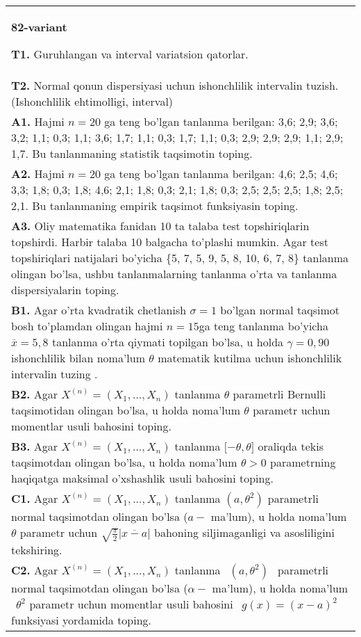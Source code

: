 \documentclass{article}
\begin{document}
\begin{tabular}{m{17cm}}
\textbf{82-variant}
\newline

\textbf{T1.} 
Guruhlangan va interval variatsion qatorlar.
\\
\textbf{T2.} 
Normal qonun dispersiyasi uchun ishonchlilik intervalin tuzish. (Ishonchlilik ehtimolligi, interval)
\\
\textbf{A1.} 
Hajmi \(n = 20\) ga teng bo'lgan tanlanma berilgan: 3,6; 2,9; 3,6; 3,2; 1,1; 0,3; 1,1; 3,6; 1,7; 1,1; 0,3; 1,7; 1,1; 0,3; 2,9; 2,9; 2,9; 1,1; 2,9; 1,7. Bu tanlanmaning statistik taqsimotin toping.
\\
\textbf{A2.} 
Hajmi \(n = 20\) ga teng bo'lgan tanlanma berilgan: 4,6; 2,5; 4,6; 3,3; 1,8; 0,3; 1,8; 4,6; 2,1; 1,8; 0,3; 2,1; 1,8; 0,3; 2,5; 2,5; 2,5; 1,8; 2,5; 2,1. Bu tanlanmaning empirik taqsimot funksiyasin toping.
\\
\textbf{A3.} 
Oliy matematika fanidan 10 ta talaba test topshiriqlarin topshirdi. Harbir talaba 10 balgacha to'plashi mumkin. Agar test topshiriqlari natijalari bo'yicha \{5, 7, 5, 9, 5, 8, 10, 6, 7, 8\} tanlanma olingan bo'lsa, ushbu tanlanmalarning tanlanma o'rta va tanlanma dispersiyalarin toping.
\\
\textbf{B1.} 
Agar o'rta kvadratik chetlanish \(\sigma = 1\) bo'lgan normal taqsimot bosh to'plamdan olingan hajmi \(n = 15\)ga teng tanlanma bo'yicha \(\overline{x} = 5,8\) tanlanma o'rta qiymati topilgan bo'lsa, u holda \(\gamma = 0,90\) ishonchlilik bilan noma'lum \(\theta\) matematik kutilma uchun ishonchlilik intervalin tuzing .
\\
\textbf{B2.} 
Agar \(X^{(n)} = \left( X_{1},...,X_{n} \right)\) tanlanma \(\theta\) parametrli Bernulli taqsimotidan olingan bo'lsa, u holda noma'lum \(\theta\) parametr uchun momentlar usuli bahosini toping.
\\
\textbf{B3.} 
Agar \(X^{(n)} = \left( X_{1},...,X_{n} \right)\) tanlanma \(\lbrack - \theta,\theta\rbrack\) oraliqda tekis taqsimotdan olingan bo'lsa, u holda noma'lum \(\theta > 0\) parametrning haqiqatga maksimal o'xshashlik usuli bahosini toping.
\\
\textbf{C1.} 
Agar \(X^{(n)} = \left( X_{1},...,X_{n} \right)\) tanlanma \(\left( a,\theta^{2} \right)\) parametrli normal taqsimotdan olingan bo'lsa (\(a -\) ma'lum), u holda noma'lum \(\theta\) parametr uchun \(\sqrt{\frac{\pi}{2}}\left| \overline{x - a} \right|\) bahoning siljimaganligi va asosliligini tekshiring.
\\
\textbf{C2.} 
Agar \(X^{(n)} = \left( X_{1},...,X_{n} \right)\) tanlanma \(\ \ (a,\theta^{2})\ \ \) parametrli normal taqsimotdan olingan bo'lsa (\(\alpha -\) ma'lum), u holda noma'lum \(\ \ \theta^{2}\) parametr uchun momentlar usuli bahosini \(\ \ g(x) = (x - a)^{2}\) funksiyasi yordamida toping.

\end{tabular}
\end{document}
